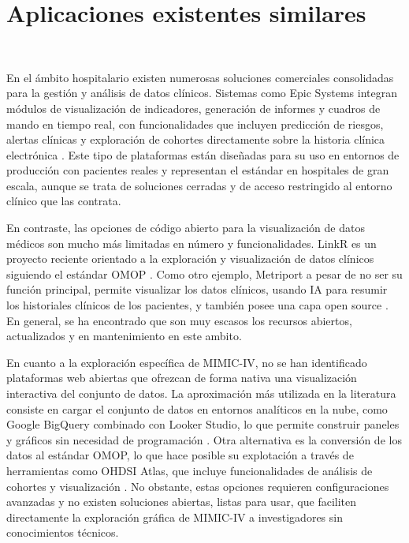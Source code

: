 \newpage
\section{Aplicaciones existentes similares}\

En el ámbito hospitalario existen numerosas soluciones comerciales consolidadas para la gestión y análisis de datos clínicos. Sistemas como Epic Systems integran módulos de visualización de indicadores, generación de informes y cuadros de mando en tiempo real, con funcionalidades que incluyen predicción de riesgos, alertas clínicas y exploración de cohortes directamente sobre la historia clínica electrónica \cite{Epic}. Este tipo de plataformas están diseñadas para su uso en entornos de producción con pacientes reales y representan el estándar en hospitales de gran escala, aunque se trata de soluciones cerradas y de acceso restringido al entorno clínico que las contrata.

En contraste, las opciones de código abierto para la visualización de datos médicos son mucho más limitadas en número y funcionalidades. LinkR es un proyecto reciente orientado a la exploración y visualización de datos clínicos siguiendo el estándar OMOP \cite{linkR}. Como otro ejemplo, Metriport a pesar de no ser su función principal, permite visualizar los datos clínicos, usando IA para resumir los historiales clínicos de los pacientes, y también posee una capa open source \cite{metriport}. En general, se ha encontrado que son muy escasos los recursos abiertos, actualizados y en mantenimiento en este ambito.


En cuanto a la exploración específica de MIMIC-IV, no se han identificado plataformas web abiertas que ofrezcan de forma nativa una visualización interactiva del conjunto de datos. La aproximación más utilizada en la literatura consiste en cargar el conjunto de datos en entornos analíticos en la nube, como Google BigQuery combinado con Looker Studio, lo que permite construir paneles y gráficos sin necesidad de programación \cite{bigquery_mimic}. Otra alternativa es la conversión de los datos al estándar OMOP, lo que hace posible su explotación a través de herramientas como OHDSI Atlas, que incluye funcionalidades de análisis de cohortes y visualización \cite{OHDSI_Atlas, MIMICIV_OMOP_Demo}. No obstante, estas opciones requieren configuraciones avanzadas y no existen soluciones abiertas, listas para usar, que faciliten directamente la exploración gráfica de MIMIC-IV a investigadores sin conocimientos técnicos.


